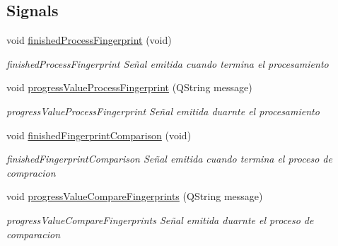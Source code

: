 \subsection*{Signals}
\begin{DoxyCompactItemize}
\item 
\hypertarget{class_process_fingerprint_a0aab549a54402a9af407f74f5ab88ed5}{void \hyperlink{class_process_fingerprint_a0aab549a54402a9af407f74f5ab88ed5}{finished\+Process\+Fingerprint} (void)}\label{class_process_fingerprint_a0aab549a54402a9af407f74f5ab88ed5}

\begin{DoxyCompactList}\small\item\em finished\+Process\+Fingerprint Señal emitida cuando termina el procesamiento \end{DoxyCompactList}\item 
void \hyperlink{class_process_fingerprint_af40be3dc9ad1557aec8d143280ffbe37}{progress\+Value\+Process\+Fingerprint} (Q\+String message)
\begin{DoxyCompactList}\small\item\em progress\+Value\+Process\+Fingerprint Señal emitida duarnte el procesamiento \end{DoxyCompactList}\item 
\hypertarget{class_process_fingerprint_aae2a751a3dd9ac41755df94212483f4d}{void \hyperlink{class_process_fingerprint_aae2a751a3dd9ac41755df94212483f4d}{finished\+Fingerprint\+Comparison} (void)}\label{class_process_fingerprint_aae2a751a3dd9ac41755df94212483f4d}

\begin{DoxyCompactList}\small\item\em finished\+Fingerprint\+Comparison Señal emitida cuando termina el proceso de compracion \end{DoxyCompactList}\item 
void \hyperlink{class_process_fingerprint_a888be8ba7023f86c4dab1c6b037d5066}{progress\+Value\+Compare\+Fingerprints} (Q\+String message)
\begin{DoxyCompactList}\small\item\em progress\+Value\+Compare\+Fingerprints Señal emitida duarnte el proceso de comparacion \end{DoxyCompactList}\end{DoxyCompactItemize}
